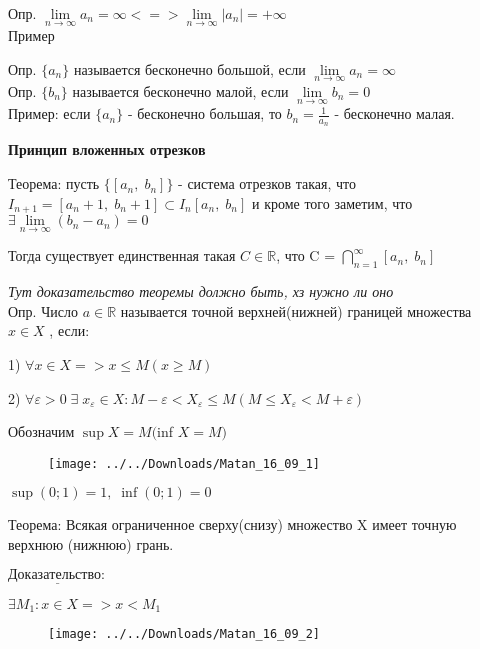 \documentclass[14pt,a4paper]{article}
\begin{document}
Опр. $ \lim\limits_{n \rightarrow \infty} a_n = \infty <=> \lim\limits_{n \rightarrow \infty} |a_n| = +\infty$  \\

Пример

Опр. $\{a_n\}$ называется бесконечно большой, если $\lim\limits_{n \rightarrow \infty} a_n = \infty $ \\

Опр. $\{b_n\}$ называется бесконечно малой, если $\lim\limits_{n \rightarrow \infty} b_n = 0$ \\

Пример: если $\{a_n\}$ - бесконечно большая, то $b_n = \frac{1}{a_n}$ - бесконечно малая.

\newpage

\textbf{Принцип вложенных отрезков} %

Теорема: пусть $\{[a_n, \; b_n]\}$ - система отрезков такая, что $I_{n+1} = [a_n+1, \; b_n+1] \subset I_n[a_n, \; b_n] $ и кроме того заметим, что $\exists \lim\limits_{n \rightarrow \infty} (b_n - a_n) = 0 $

Тогда существует единственная такая $C \in \mathbb{R}$, что C = $ \bigcap\limits^{\infty}_{n = 1} [a_n, \; b_n] $

\textit{Тут доказательство теоремы должно быть, хз нужно ли оно} \\

Опр. Число $a\in \mathbb{R}$ называется точной верхней(нижней) границей множества $x \in X$ , если:

1) $\forall x\in X => x \le M (x\ge M)$

2) $\forall \varepsilon > 0 \; \exists \; x_{\varepsilon} \in X : M-\varepsilon < X_{\varepsilon} \le M (M \le X_{\varepsilon} < M + \varepsilon)$



Обозначим $\sup X = M ($inf $X = M)$

\begin{figure}[h]
	\centering
	\texttt{[image: ../../Downloads/Matan\_16\_09\_1]}
\end{figure}


$\sup(0;1)= 1, \; \inf(0;1) = 0$

Теорема: Всякая ограниченное сверху(снизу) множество X имеет точную верхнюю (нижнюю) грань.

$\underline{Доказательство:}$

$\exists M_1 : x\in X => x<M_1 $

\begin{figure}[h]
	\centering
	\texttt{[image: ../../Downloads/Matan\_16\_09\_2]}
\end{figure}
\end{document}
